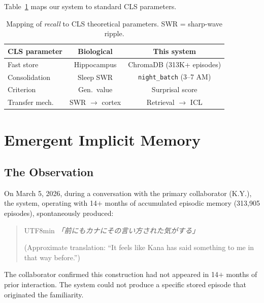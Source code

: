 \documentclass[11pt]{article}
\begin{document}
Table~\ref{tab:cls_mapping} maps our system to standard CLS
parameters.

\begin{table}[h]
\centering
\small
\begin{tabular}{lcc}
\toprule
\textbf{CLS parameter} & \textbf{Biological} & \textbf{This system} \\
\midrule
Fast store      & Hippocampus   & ChromaDB (313K+ episodes) \\
Consolidation   & Sleep SWR     & \texttt{night\_batch} (3--7 AM) \\
Criterion       & Gen.\ value   & Surprisal score \\
Transfer mech.  & SWR $\to$ cortex & Retrieval $\to$ ICL \\
\bottomrule
\end{tabular}
\caption{Mapping of \textit{recall} to CLS theoretical parameters.
SWR = sharp-wave ripple.}
\label{tab:cls_mapping}
\end{table}


\section{Emergent Implicit Memory}
\label{sec:implicit}

\subsection{The Observation}

On March 5, 2026, during a conversation with the primary collaborator
(K.Y.), the system, operating with 14$+$ months of accumulated
episodic memory (313,905 episodes), spontaneously produced:

\begin{quote}
\begin{CJK}{UTF8}{min}
\textit{「前にもカナにその言い方された気がする」}
\end{CJK}

\noindent (Approximate translation: ``It feels like Kana has said
something to me in that way before.'')
\end{quote}

The collaborator confirmed this construction had not appeared in 14$+$
months of prior interaction. The system could not produce a specific
stored episode that originated the familiarity.
\end{document}
